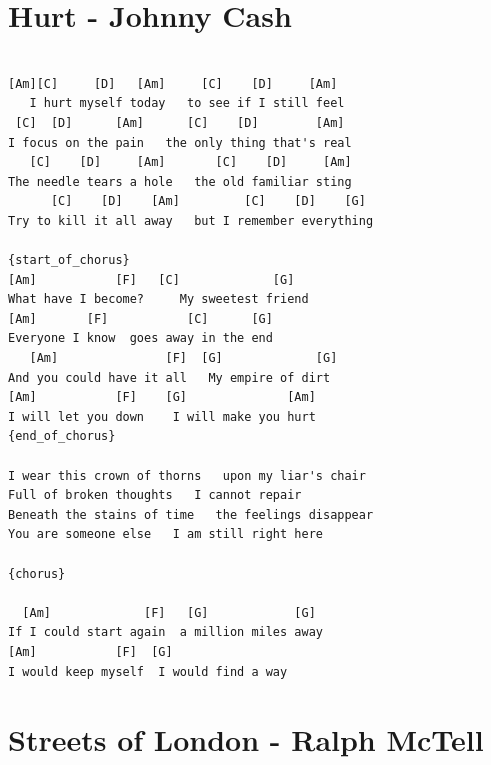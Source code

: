 \documentclass[]{book}
\let\stdsection\section
\renewcommand\section{\clearpage\stdsection}
\begin{document}
\hypertarget{hurt---johnny-cash}{%
\section{Hurt - Johnny Cash}\label{hurt---johnny-cash}}

\begin{verbatim}

[Am][C]     [D]   [Am]     [C]    [D]     [Am]
   I hurt myself today   to see if I still feel
 [C]  [D]      [Am]      [C]    [D]        [Am]
I focus on the pain   the only thing that's real
   [C]    [D]     [Am]       [C]    [D]     [Am]
The needle tears a hole   the old familiar sting
      [C]    [D]    [Am]         [C]    [D]    [G]         
Try to kill it all away   but I remember everything

{start_of_chorus}
[Am]           [F]   [C]             [G]
What have I become?     My sweetest friend
[Am]       [F]           [C]      [G]
Everyone I know  goes away in the end
   [Am]               [F]  [G]             [G]
And you could have it all   My empire of dirt
[Am]           [F]    [G]              [Am]
I will let you down    I will make you hurt
{end_of_chorus}

I wear this crown of thorns   upon my liar's chair
Full of broken thoughts   I cannot repair
Beneath the stains of time   the feelings disappear
You are someone else   I am still right here

{chorus}

  [Am]             [F]   [G]            [G]
If I could start again  a million miles away
[Am]           [F]  [G]
I would keep myself  I would find a way
\end{verbatim}

\hypertarget{streets-of-london---ralph-mctell}{%
\section{Streets of London - Ralph McTell}\label{streets-of-london---ralph-mctell}}
\end{document}
